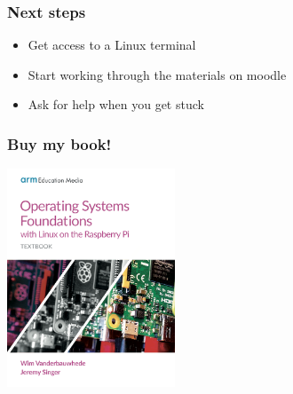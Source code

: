 \documentclass[17pt]{beamer}
\begin{document}
\begin{frame}
  \frametitle{Next steps}

  \begin{itemize}
  \item Get access to a Linux terminal
  \item Start working through the materials on moodle
  \item Ask for help when you get stuck
  \end{itemize}
  
\end{frame}

\begin{frame}
  \frametitle{Buy my book!}

  \begin{center}
    \includegraphics[width=5cm]{cover.png}
  \end{center}
  
\end{frame}


\end{document}
